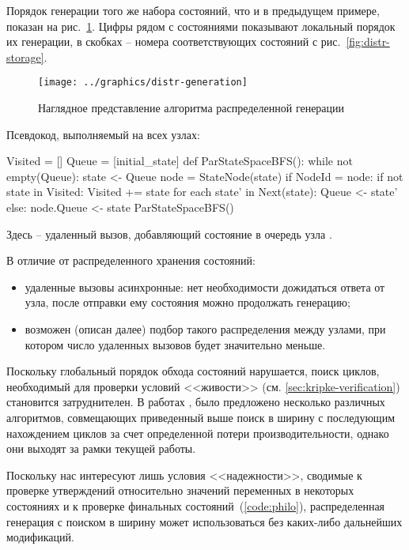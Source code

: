 Порядок генерации того же набора состояний, что и в предыдущем примере, показан на
рис.~\ref{fig:distr-generation}. Цифры рядом с состояниями показывают локальный порядок их
генерации, в скобках -- номера соответствующих состояний с рис.~\ref{fig:distr-storage}.

\begin{figure}[!htb]
  \centering
  \texttt{[image: ../graphics/distr-generation]}
  \caption{Наглядное представление алгоритма распределенной генерации}
  \label{fig:distr-generation}
\end{figure}

Псевдокод, выполняемый на всех узлах:

\begin{CodeBlock}
Visited = []
Queue = [initial_state]
def ParStateSpaceBFS():
    while not empty(Queue):
        state <- Queue
        node = StateNode(state)
        if NodeId = node:
            if not state in Visited:
                Visited += state
                for each state' in Next(state):
                    Queue <- state'
        else:
            node.Queue <- state
ParStateSpaceBFS()
\end{CodeBlock}

Здесь  -- удаленный вызов, добавляющий состояние в очередь узла
.

В отличие от распределенного хранения состояний:
\begin{itemize}
\item удаленные вызовы асинхронные: нет необходимости дожидаться ответа от узла, после
  отправки ему состояния можно продолжать генерацию;
\item возможен (описан далее) подбор такого распределения  между узлами,
  при котором число удаленных вызовов будет значительно меньше.~\cite{LS99}
\end{itemize}

Поскольку глобальный порядок обхода состояний нарушается, поиск циклов, необходимый для
проверки условий <<живости>> (см. \ref{sec:kripke-verification}) становится
затруднителен. В работах \cite{DLTL1}, \cite{DLTL2} было предложено несколько различных
алгоритмов, совмещающих приведенный выше поиск в ширину с последующим нахождением циклов
за счет определенной потери производительности, однако они выходят за рамки текущей работы.

Поскольку нас интересуют лишь условия <<надежности>>, сводимые к проверке утверждений
относительно значений переменных в некоторых состояниях и к проверке финальных
состояний~(\ref{code:philo}), распределенная генерация с поиском в ширину может
использоваться без каких-либо дальнейших модификаций.

